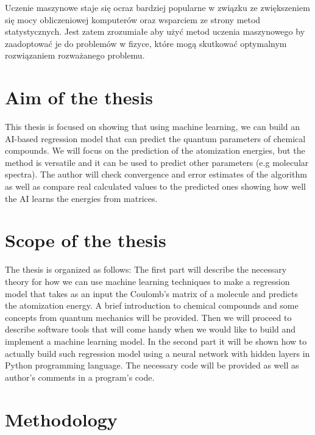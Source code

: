 \documentclass[a4paper,oneside,openright,11pt]{book}
\begin{document}
Uczenie maszynowe staje się ocraz bardziej popularne w związku ze zwiększeniem się mocy obliczeniowej komputerów oraz wsparciem ze strony metod statystycznych. Jest zatem zrozumiałe aby użyć metod uczenia maszynowego by zaadoptować je do problemów w fizyce, które mogą skutkować optymalnym rozwiązaniem rozważanego problemu.



%
%

\tableofcontents

\newpage

\section{Aim of the thesis}

This thesis is focused on showing that using machine learning, we can build an AI-based regression model that can predict the quantum parameters of chemical compounds. We will focus on the prediction of the atomization energies, but the method is versatile and it can be used to predict other parameters (e.g molecular spectra). The author will check convergence and error estimates of the algorithm  as well as compare real calculated values to the predicted ones showing how well the AI learns the energies from matrices.

\section{Scope of the thesis}

The thesis is organized as follows: The first part will describe the necessary theory for how we can use machine learning techniques to make a regression model that takes as an input the Coulomb’s matrix of a molecule and predicts the atomization energy. A brief introduction to chemical compounds and some concepts from quantum mechanics will be provided. Then we will proceed to describe software tools that will come handy when we would like to build and implement a machine learning model. In the second part it will be shown how to actually build such regression model using a neural network with hidden layers in Python programming language. The necessary code will be provided as well as author’s comments in a program’s code.

\section{Methodology}
\end{document}
